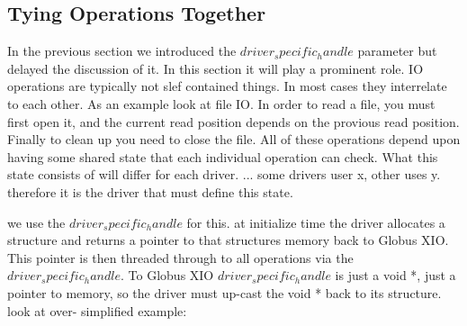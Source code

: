\documentclass[11pt]{article}
\begin{document}
\subsection{Tying Operations Together}
In the previous section we introduced the $driver_specific_handle$ parameter
but delayed the discussion of it.  In this section it will play a 
prominent role.  IO operations are typically not slef contained things.
In most cases they interrelate to each other.  As an example look at file
IO.  In order to read a file, you must first open it, and the current
read position depends on the provious read position.  Finally to clean up
you need to close the file.  All of these operations depend upon having some
shared state that each individual operation can check.  What this state
consists of will differ for each driver.  ...
some drivers user x, other uses y.  therefore it is the driver that must 
define this state.

we use the $driver_specific_handle$ for this.  at initialize time the
driver allocates a structure and returns a pointer to that structures
memory back to Globus XIO.  This pointer is then threaded through to all
operations via the $driver_specific_handle$.  To Globus XIO
$driver_specific_handle$ is just a void *, just a pointer to memory, so 
the driver must up-cast the void * back to its structure.  look at over-
simplified example:
\end{document}
